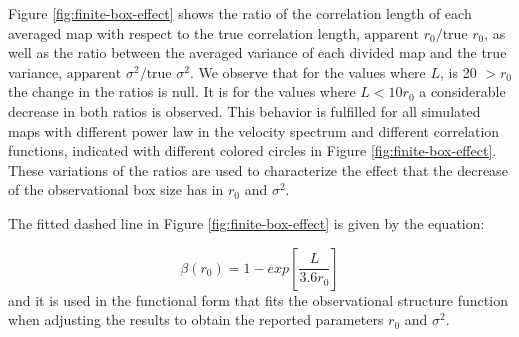 \documentclass[fleqn,usenatbib, useAMS, a4paper]{mnras}
\begin{document}
Figure \ref{fig:finite-box-effect} shows the ratio of the correlation length of each averaged map with respect to the true correlation length, \(\text{apparent } r_ 0 /\text{true } r_0 \), as well as the ratio between the averaged variance of each divided map and the true variance, \(\text{apparent } \sigma^2  / \text{true } \sigma^2\).
We observe that for the values where \(L\), is 20 $> r_0 $ the change in the ratios is null.
It is for the values where \( L < 10 r_0 \) a considerable decrease in both ratios is observed.
This behavior is fulfilled for all simulated maps with different power law in the velocity spectrum and different correlation functions, indicated with different colored circles in Figure \ref{fig:finite-box-effect}. 
These variations of the ratios are used to characterize the effect that the decrease of the observational box size has in \(r_0\) and \(\sigma^2\).

The fitted dashed line in Figure \ref{fig:finite-box-effect} is given by the equation: 

\begin{equation}\label{eq:ajustebox}
\beta(r_0) = 1 - exp \left[ \frac{L}{3.6r_0} \right] 
\end{equation}
%
and it is used in the functional form that fits the observational structure function when adjusting the results to obtain the reported parameters \(r_0\) and \(\sigma^2 \). 
\end{document}
